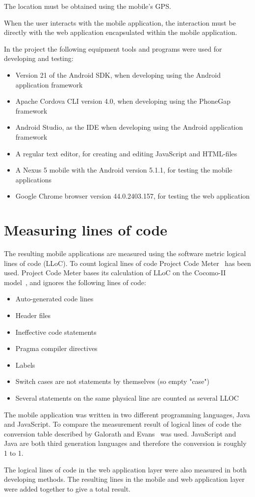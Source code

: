 The location must be obtained using the mobile’s GPS. 

When the user interacts with the mobile application, the interaction must be directly with the web application encapsulated within the mobile application. 

In the project the following equipment tools and programs were used for developing and testing:
\begin{itemize}
\item Version 21 of the Android SDK, when developing using the Android application framework
\item Apache Cordova CLI version 4.0, when developing using the PhoneGap framework
\item Android Studio, as the IDE when developing using the Android application framework
\item A regular text editor, for creating and editing JavaScript and HTML-files
\item A Nexus 5 mobile with the Android version 5.1.1, for testing the mobile applications
\item Google Chrome browser version 44.0.2403.157, for testing the web application
\end{itemize}

\section{Measuring lines of code}\label{sec:measuring-lines-of-code}
The resulting mobile applications are measured using the software metric logical lines of code (LLoC). To count logical lines of code Project Code Meter~\cite{project-code-meter2015} has been used. Project Code Meter bases its calculation of LLoC on the Cocomo-II model~\cite{cocomo-ii-model}, and ignores the following lines of code:

\begin{itemize}
\item Auto-generated code lines
\item Header files
\item Ineffective code statements
\item Pragma compiler directives
\item Labels
\item Switch cases are not statements by themselves (so empty "case")
\item Several statements on the same physical line are counted as several LLOC
\end{itemize}

The mobile application was written in two different programming languages, Java and JavaScript. To compare the measurement result of logical lines of code the conversion table described by Galorath and Evans~\cite[p.~163]{galorath2006} was used. JavaScript and Java are both third generation languages and therefore the conversion is roughly 1 to 1. 

The logical lines of code in the web application layer were also measured in both developing methods. The resulting lines in the mobile and web application layer were added together to give a total result. 